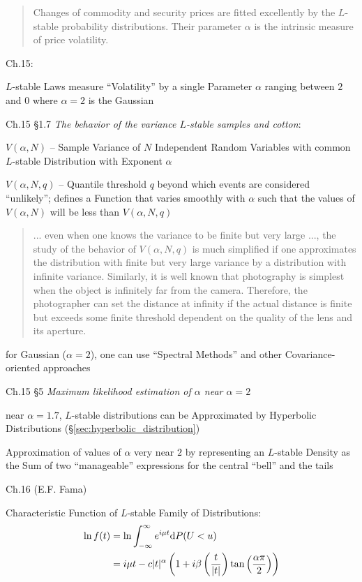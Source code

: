 \begin{quote}
  Changes of commodity and security prices are fitted excellently by the
  $L$-stable probability distributions. Their parameter $\alpha$ is the
  intrinsic measure of price volatility.
\end{quote}

Ch.15:

$L$-stable Laws measure ``Volatility'' by a single Parameter $\alpha$ ranging
between $2$ and $0$ where $\alpha = 2$ is the Gaussian

Ch.15 \S 1.7 \emph{The behavior of the variance $L$-stable samples and cotton}:

$V(\alpha, N)$ -- Sample Variance of $N$ Independent Random Variables with
common $L$-stable Distribution with Exponent $\alpha$

$V(\alpha, N, q)$ -- Quantile threshold $q$ beyond which events are considered
``unlikely''; defines a Function that varies smoothly with $\alpha$ such that
the values of $V(\alpha, N)$ will be less than $V(\alpha, N, q)$

\begin{quote}
  ... even when one knows the variance to be finite but very large ..., the
  study of the behavior of $V(\alpha, N, q)$ is much simplified if one
  approximates the distribution with finite but very large variance by a
  distribution with infinite variance. Similarly, it is well known that
  photography is simplest when the object is infinitely far from the camera.
  Therefore, the photographer can set the distance at infinity if the actual
  distance is finite but exceeds some finite threshold dependent on the quality
  of the lens and its aperture.
\end{quote}

for Gaussian ($\alpha = 2$), one can use ``Spectral Methods'' and other
Covariance-oriented approaches

Ch.15 \S 5 \emph{Maximum likelihood estimation of $\alpha$ near $\alpha = 2$}

near $\alpha = 1.7$, $L$-stable distributions can be Approximated by Hyperbolic
Distributions (\S\ref{sec:hyperbolic_distribution})

Approximation of values of $\alpha$ very near $2$ by representing an $L$-stable
Density as the Sum of two ``manageable'' expressions for the central ``bell''
and the tails

Ch.16 (E.F. Fama)

Characteristic Function of $L$-stable Family of Distributions:
\begin{align*}
  \ln f(t) & = \ln \int_{-\infty}^\infty e^{i\mu t} \mathrm{d}P(U < u) \\
           & = i\mu t - c|t|^\alpha \left(
              1 + i\beta\left(\frac{t}{|t|}\right)
              \tan\left(\frac{\alpha\pi}{2}\right)
           \right) \\
\end{align*}

